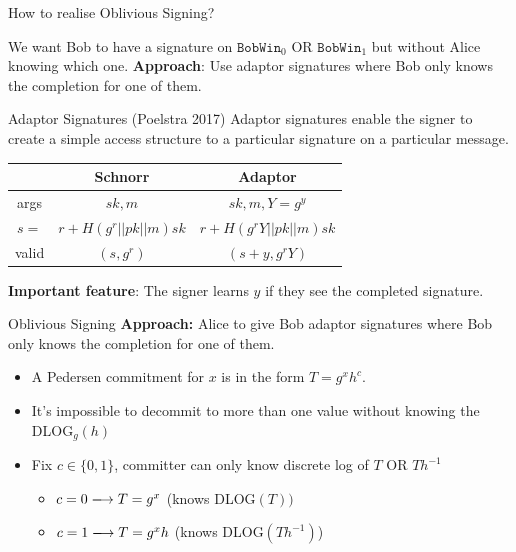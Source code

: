 \documentclass{beamer}
\begin{document}

\begin{frame}{How to realise Oblivious Signing?}
    
    We want Bob to have a signature on $\texttt{BobWin}_0$ OR $\texttt{BobWin}_1$ but without Alice knowing which one.
    \pause
    \newline
    \newline
    \textbf{Approach}: Use adaptor signatures where Bob only knows the completion for one of them.
\end{frame}


\begin{frame}{Adaptor Signatures (Poelstra 2017)}
    Adaptor signatures enable the signer to create a simple access structure to a particular signature on a particular message.
    \\
    \begin{center}
    \begin{tabular}{|c|c|c|}
       \hline
       & Schnorr & Adaptor \\ \hline
       args & $sk, m$  &  $sk, m, Y = g^y$ \\ \hline
       $s = $& $r + H(g^r || pk || m)sk$ & $r + H(g^rY || pk || m)sk$  \\ \hline
       valid & $(s, g^{r})$ & $(s + y, g^{r}Y )$ \\ \hline
    \end{tabular}
    \end{center}
    \pause
    \textbf{Important feature}: The signer learns $y$ if they see the completed signature.
    
\end{frame}
\begin{frame}{Oblivious Signing}
    \textbf{Approach:} Alice to give Bob adaptor signatures where Bob only knows the completion for one of them.
    \pause
    \begin{itemize}
        \item<1-> A Pedersen commitment for $x$ is in the form $T = g^xh^c$.
        \item<2-> It's impossible to decommit to more than one value without knowing the DLOG$_g(h)$
        \item<3-> Fix $c \in \{0,1\}$, committer can only know discrete log of $T$ OR $Th^{-1}$
        \begin{itemize}
            \item $c = 0 \xlongrightarrow{} T = g^x$ (knows DLOG$(T))$
            \item $c = 1 \xlongrightarrow{} T = g^{x}h$ (knows DLOG$(Th^{-1})$)
        \end{itemize}
    \end{itemize}
\end{frame}
\end{document}
